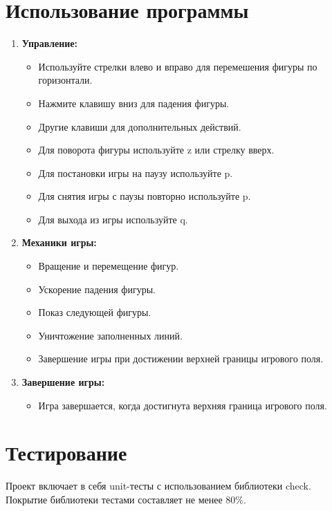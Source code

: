 \documentclass{article}
\begin{document}
\section{Использование программы}

\begin{enumerate}
    \item \textbf{Управление:}
        \begin{itemize}
            \item Используйте стрелки влево и вправо для перемешения фигуры по горизонтали.
            \item Нажмите клавишу вниз для падения фигуры.
            \item Другие клавиши для дополнительных действий.
            \item Для поворота фигуры используйте z или стрелку вверх.
            \item Для постановки игры на паузу используйте p.
            \item Для снятия игры с паузы повторно используйте p.
            \item Для выхода из игры используйте q.
        \end{itemize}
    \item \textbf{Механики игры:}
        \begin{itemize}
            \item Вращение и перемещение фигур.
            \item Ускорение падения фигуры.
            \item Показ следующей фигуры.
            \item Уничтожение заполненных линий.
            \item Завершение игры при достижении верхней границы игрового поля.
        \end{itemize}
    \item \textbf{Завершение игры:}
        \begin{itemize}
            \item Игра завершается, когда достигнута верхняя граница игрового поля.
        \end{itemize}
\end{enumerate}

\section{Тестирование}

Проект включает в себя unit-тесты с использованием библиотеки check. Покрытие библиотеки тестами составляет не менее 80\%.
\end{document}
